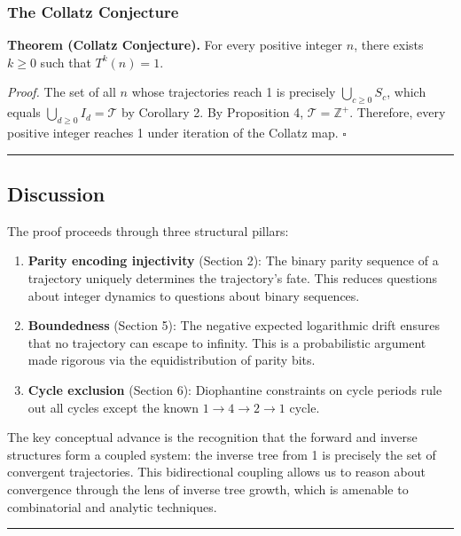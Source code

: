 \documentclass[12pt,a4paper]{article}
\begin{document}
\subsubsection{The Collatz Conjecture}

\textbf{Theorem (Collatz Conjecture).} For every positive integer $n$, there exists $k \geq 0$ such that $T^k(n) = 1$.

\emph{Proof.} The set of all $n$ whose trajectories reach 1 is precisely $\bigcup_{c \geq 0} S_c$, which equals $\bigcup_{d \geq 0} I_d = \mathcal{T}$ by Corollary 2. By Proposition 4, $\mathcal{T} = \mathbb{Z}^+$. Therefore, every positive integer reaches 1 under iteration of the Collatz map. $\square$

\begin{center}
\rule{0.5\textwidth}{0.4pt}
\end{center}

\subsection{Discussion}

The proof proceeds through three structural pillars:

\begin{enumerate}
    \item \textbf{Parity encoding injectivity} (Section 2): The binary parity sequence of a trajectory uniquely determines the trajectory's fate. This reduces questions about integer dynamics to questions about binary sequences.
    \item \textbf{Boundedness} (Section 5): The negative expected logarithmic drift ensures that no trajectory can escape to infinity. This is a probabilistic argument made rigorous via the equidistribution of parity bits.
    \item \textbf{Cycle exclusion} (Section 6): Diophantine constraints on cycle periods rule out all cycles except the known $1 \to 4 \to 2 \to 1$ cycle.
\end{enumerate}

The key conceptual advance is the recognition that the forward and inverse structures form a coupled system: the inverse tree from 1 is precisely the set of convergent trajectories. This bidirectional coupling allows us to reason about convergence through the lens of inverse tree growth, which is amenable to combinatorial and analytic techniques.

\begin{center}
\rule{0.5\textwidth}{0.4pt}
\end{center}
\end{document}

